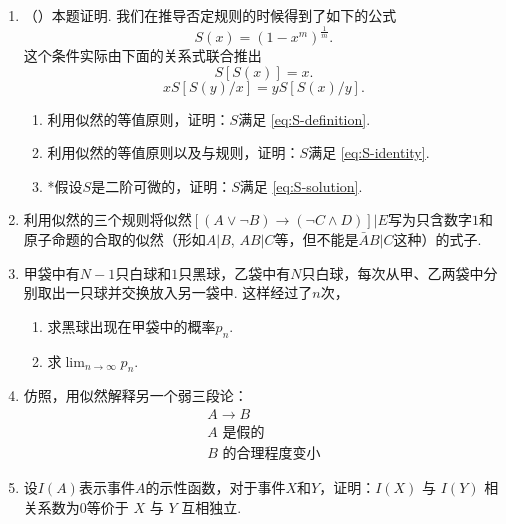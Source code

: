 \begin{enumerate}[wide, labelindent=0pt]
    
    \item \label{exercise:derive-S} （\cite{coxProbabilityFrequencyReasonable1946}）本题证明. 我们在推导否定规则的时候得到了如下的公式
    \begin{equation}
        S(x) = (1-x^m)^\frac{1}{m}. \label{eq:S-solution}
    \end{equation}
    这个条件实际由下面的关系式联合推出
    \begin{equation}
        S[S(x)] = x. \label{eq:S-definition}
    \end{equation}
    \begin{equation}
        x S[S(y)/x] = y S[S(x)/y]. \label{eq:S-identity}
    \end{equation}
    \begin{enumerate}
        \item 利用似然的等值原则，证明：$S$满足 \eqref{eq:S-definition}.
        \item 利用似然的等值原则以及与规则，证明：$S$满足 \eqref{eq:S-identity}.
        \item *假设$S$是二阶可微的，证明：$S$满足 \eqref{eq:S-solution}.
    \end{enumerate}
    
    \item 利用似然的三个规则将似然$[(A \vee \neg B) \to (\neg C \wedge D)]  |  E$写为只含数字$1$和原子命题的合取的似然（形如$A|B$, $AB|C$等，但不能是$\bar{A}B|C$这种）的式子.

    \item 甲袋中有$N-1$只白球和$1$只黑球，乙袋中有$N$只白球，每次从甲、乙两袋中分别取出一只球并交换放入另一袋中. 这样经过了$n$次，
        \begin{enumerate}
            \item   求黑球出现在甲袋中的概率$p_n$.
            \item   求$\lim_{n\to\infty}p_n$.
        \end{enumerate}
    
    \item 仿照，用似然解释另一个弱三段论：
    \[
    \begin{array}{c}  
        A \to B \\ A\text{ 是假的} \\ \hline B\text{ 的合理程度变小}
    \end{array}
    \]

    \item \label{exercise:correlation-independence} 设$I(A)$表示事件$A$的示性函数，对于事件$X$和$Y$，证明：$I(X)$ 与 $I(Y)$ 相关系数为$0$等价于 $X$ 与 $Y$ 互相独立.


\end{enumerate}
